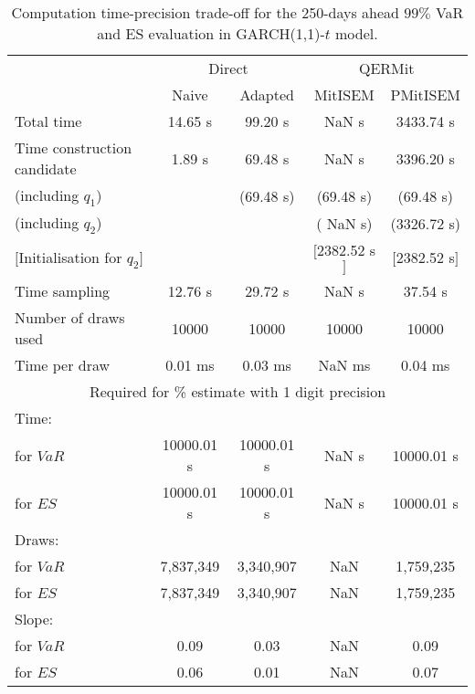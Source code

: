{ \renewcommand{\arraystretch}{1.3} 
\begin{table}[h] 
\centering 
\caption{Computation time-precision trade-off for the 250-days ahead  $99\%$ VaR and ES evaluation in GARCH(1,1)-$t$ model.} 
\label{tab:time_precision_t_garch2_noS} 
\begin{tabular}{lcccc}  
  & \multicolumn{2}{c}{Direct} & \multicolumn{2}{c}{QERMit}  \\ \cline{2-5} 
  & Naive & Adapted & MitISEM & PMitISEM  \\ \hline 
Total time & 14.65 s & 99.20 s &  NaN s & 3433.74 s \\ 
Time construction candidate & 1.89 s & 69.48 s &  NaN s & 3396.20 s \\ 
 (including $q_{1}$) &   &  (69.48 s) & (69.48 s) & (69.48 s) \\ 
 (including $q_{2}$) &   &  & ( NaN s) & (3326.72 s) \\ 
$[$Initialisation for $q_{2}$$]$&   &   & $[$2382.52 s$]$ & $[$2382.52 s$]$ \\ 
Time sampling & 12.76 s & 29.72 s &  NaN s & 37.54 s  \\  
Number of draws used & 10000 & 10000 & 10000 & 10000 \\ 
Time per draw & 0.01 ms & 0.03 ms &  NaN ms & 0.04 ms \\ \hline 
\multicolumn{5}{c}{Required for \% estimate with 1 digit precision} \\ \hline 
Time: &  &  &   &  \\ 
\hspace{1cm} for $VaR$ & 10000.01 s & 10000.01 s &  NaN s & 10000.01 s \\ 
\hspace{1cm} for $ES$ & 10000.01 s & 10000.01 s &  NaN s & 10000.01 s \\ 
Draws: &  &  &   &  \\ 
\hspace{1cm} for $VaR$ & 7,837,349 & 3,340,907  & NaN  & 1,759,235  \\ 
\hspace{1cm} for $ES$ & 7,837,349 & 3,340,907  & NaN   & 1,759,235  \\ 
\hline 
Slope: &  &  &   &  \\ 
\hspace{1cm} for $VaR$ & 0.09 & 0.03  &  NaN  & 0.09  \\ 
\hspace{1cm} for $ES$ & 0.06 & 0.01  &  NaN   & 0.07  \\  \hline 
\end{tabular} 
\end{table} 
} 

